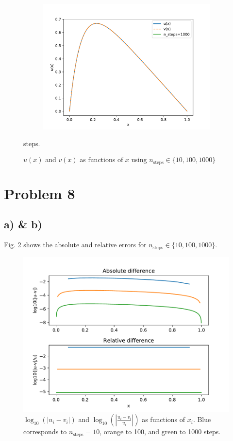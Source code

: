 \documentclass[english,notitlepage]{revtex4-2}  %
\begin{document}
\begin{figure}[h]
\begin{subfigure}[b]{0.45\textwidth}
		\includegraphics[scale=0.5]{imgs/problem7b_output_1000.pdf}	
	\end{subfigure}	
	\caption{$u(x)$ and $v(x)$ as functions of $x$ using $n_{\text{steps}}\in\{10, 100, 1000\}$} steps.
	\label{fig:3}
\end{figure}

\section*{Problem 8}
\subsection*{a) \& b)}
Fig. \ref{fig:4} shows the absolute and relative errors for $n_{\text{steps}}\in\{10, 100, 1000\}$.

\begin{figure}
	\includegraphics[scale=0.9]{imgs/problem8_output.pdf}
	\caption{$\log_{10}(|u_i-v_i|)$ and $\log_{10}(|\frac{u_i-v_i}{u_i}|)$ as functions of $x_i$. Blue corresponds to $n_{\text{steps}}=10$, orange to 100, and green to 1000 steps.}
	\label{fig:4}
\end{figure}
\end{document}
